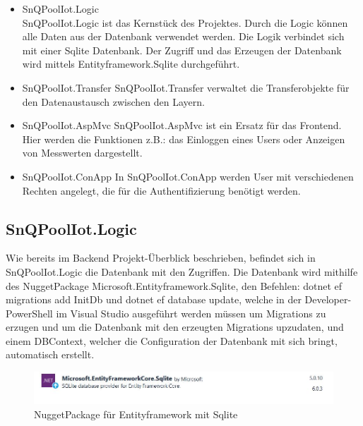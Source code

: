 \begin{itemize}
    \item SnQPoolIot.Logic
    \\
    SnQPoolIot.Logic ist das Kernstück des Projektes. 
    Durch die Logic können alle Daten aus der Datenbank verwendet werden. 
    Die Logik verbindet sich mit einer Sqlite Datenbank. Der Zugriff und das Erzeugen der Datenbank wird mittels Entityframework.Sqlite durchgeführt.
\end{itemize}

\begin{itemize}
    \item SnQPoolIot.Transfer
    SnQPoolIot.Transfer verwaltet die Transferobjekte für den Datenaustausch zwischen den Layern.
\end{itemize}


\begin{itemize}
    \item SnQPoolIot.AspMvc
    SnQPoolIot.AspMvc ist ein Ersatz für das Frontend.
    Hier werden die Funktionen z.B.: das Einloggen eines Users oder Anzeigen von Messwerten dargestellt.
\end{itemize}

\begin{itemize}
    \item SnQPoolIot.ConApp
    In SnQPoolIot.ConApp werden User mit verschiedenen Rechten angelegt, die für die Authentifizierung benötigt werden.
\end{itemize}



\subsection{SnQPoolIot.Logic}
Wie  bereits im Backend Projekt-Überblick beschrieben, befindet sich in SnQPoolIot.Logic die Datenbank mit den Zugriffen.
Die Datenbank wird mithilfe des NuggetPackage Microsoft.Entityframework.Sqlite, den Befehlen:
dotnet ef migrations add InitDb und dotnet ef database update, welche in der Developer-PowerShell 
im Visual Studio ausgeführt werden müssen um Migrations zu erzugen und um die Datenbank mit den erzeugten Migrations upzudaten, 
und einem DBContext, welcher die Configuration der Datenbank mit sich bringt, automatisch erstellt. 

\begin{figure}[H]
    \centering
    \includegraphics[width=1\textwidth]{pics/EntityFrameworkSqlLiteNuggetPackage.JPG}
    \caption{NuggetPackage für Entityframework mit Sqlite}
\end{figure}


